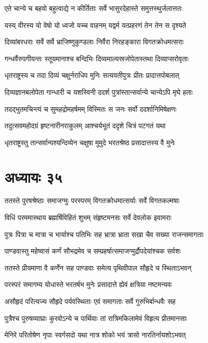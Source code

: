 \twolineshloka
{एते चान्ये च बहवो बहुत्वाद्ये न कीर्तिताः}
{सर्वे भासुरदेहास्ते समुत्तस्थुर्जलात्ततः}


\twolineshloka
{यस्य् वीरस्य यो वेषो यो ध्वजो यच्च वाहनम्}
{यद्वर्म यत्प्रहरणं तेन तेन स दृश्यते}


\twolineshloka
{दिव्यांबरधराः सर्वे सर्वे भ्राजिष्णुकुण्डलाः}
{निर्वैरा निरहङ्कारा विगतक्रोधमत्सराः}


\twolineshloka
{गन्धर्वैरुपगीयन्तः स्तूयमानाश्च बन्दिभिः}
{दिव्यमाल्यस्रजोपेतास्तथा दिव्याप्सरोवृताः}


\twolineshloka
{धृतराष्ट्रस्य च तदा दिव्यं चक्षुर्नराधिप}
{मुनिः सत्यवतीपुत्रः प्रीतः प्रादात्तपोबलात्}


\twolineshloka
{दिव्यज्ञानबलोपेता गान्धारी च यशस्विनी}
{ददर्श पुत्रांस्तान्सर्वान्ये चान्येऽपि मृघे हताः}


\twolineshloka
{तदद्भुतमचिन्त्यं च सुमहद्रोमहर्षमम्}
{विस्मितः स जनः सर्वो ददर्शानिमिषेक्षणः}


\twolineshloka
{तदुत्सवमहोदग्रं हृष्टनारीनराकुलम्}
{आश्चर्यभूतं ददृशे चित्रं पटगतं यथा}


\twolineshloka
{धृतराष्ट्रस्तु तान्सर्वान्पश्यन्दिव्येन चक्षुषा}
{मुमुदे भरतश्रेष्ठ प्रसादात्तस्य वै मुनेः}


\chapter{अध्यायः ३५}
\twolineshloka
{ततस्ते पुरषश्रेष्ठाः समाजग्मुः परस्परम्}
{विगतक्रोधमात्सर्याः सर्वे विगतकल्मषाः}


\twolineshloka
{विधिं परममास्थाय ब्रह्मर्षिविहितं शुभम्}
{संहृष्टमनसः सर्वे देवलोक इवामराः}


\twolineshloka
{पुत्रः पित्रा च मात्रा च भार्याश्च पतिभिः सह}
{भ्रात्रा भ्राता सखा चैव सख्या राजन्समागताः}


\twolineshloka
{पाण्डवास्तु महेष्वासं कर्णं सौभद्रमेव च}
{सम्प्रहर्षात्समाजग्मुर्द्रौपदेयांश्चक सर्वशः}


\twolineshloka
{ततस्ते प्रीयमाणा वै कर्णेन सह पाण्डवाः}
{समेत्य पृथिवीपाल सौहृदे च स्थिताऽभवन्}


\twolineshloka
{परस्परं समागम्य योधास्ते भरतर्षभ}
{मुनेः प्रसादात्ते ह्येवं क्षत्रिया नष्टमन्यवः}


\twolineshloka
{असौहृदं परित्यज्य सौहृदे पर्यवस्थिताः}
{एवं समागताः सर्वे गुरुभिर्बान्धवैः सह}


\twolineshloka
{पुत्रैश्च पुरुषव्याघ्राः कुरवोऽन्ये च पार्थिवाः}
{तां रात्रिमकिलामेवं विहृत्य प्रीतमानसाः}


\twolineshloka
{मेनिरे परितोषेण नृपाः स्वर्गसदो यथा}
{नात्र शोको भयं त्रासो नारतिर्नायशोऽभवत्}


